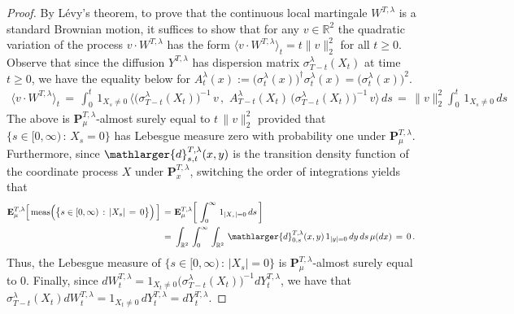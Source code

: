 \documentclass[10pt]{article}
\numberwithin{equation}{section}
\theoremstyle{definition}
\newcommand{\R}{{\mathbb R}}
\begin{document}
\begin{appendix}
\begin{proof}  By L\'evy's theorem,   to prove that the continuous local martingale $W^{T,\lambda}$ is a standard Brownian motion, it suffices to show that for any $v\in \R^2$  the quadratic variation of the process $v\cdot W^{T,\lambda}$ has the form    $\big\langle v\cdot W^{T,\lambda} \big\rangle_t=t\|v\|_2^2$ for all $t\geq 0$. 
Observe that since the diffusion $Y^{T,\lambda}$ has dispersion matrix $\sigma_{T-t}^{\lambda}(X_t) $ at time $t\geq 0$, we have the equality below for $A_{t}^{\lambda}(x):=\big(\sigma_{t}^{\lambda}(x)\big)^{\dagger}\sigma_{t}^{\lambda}(x)=\big(\sigma_{t}^{\lambda}(x)\big)^2$.
\begin{align*}
    \big\langle v\cdot W^{T,\lambda}\big\rangle_t\,=\,\int_0^t\, 1_{X_s\neq 0} \, \Big\langle \big(\sigma_{T-t}^{\lambda}(X_t)  \big)^{-1}\, v \,, \,\,A_{T-t}^{\lambda}(X_t)\, \big(\sigma_{T-t}^{\lambda}(X_t)  \big)^{-1}\, v  \Big\rangle    \, ds   \,=\,\|v\|_2^2\int_0^t \,1_{X_s\neq 0}   \, ds 
\end{align*}
The above is $\mathbf{P}^{T,\lambda}_{\mu}$-almost surely equal to $t\,\|v\|_2^2 $ provided that  $\{s\in [0,\infty)\, :\, X_s = 0   \}   $ has Lebesgue measure zero with probability one under $\mathbf{P}^{T,\lambda}_{\mu}$.  Furthermore, since $\mathlarger{d}^{T,\lambda}_{s,t}(x,y)$ is the transition density function of the coordinate process $X$ under $\mathbf{P}^{T,\lambda}_{x}$, switching the order of integrations yields that
\begin{align*}
    \mathbf{E}^{T,\lambda}_{\mu}\Big[\, \textup{meas}\Big(\big\{s\in [0,\infty)\, :\, | X_s| \,=\, 0   \big\}   \Big) \,  \Big]\,=\,&\,\mathbf{E}^{T,\lambda}_{\mu}\bigg[\, \int_0^{\infty}\, 1_{| X_s|  =  0  }\,ds     \, \bigg]
    \\ \,=\,&\,\int_{\R^2}\,\int_0^{\infty}\,\int_{\R^2}\,\mathlarger{d}^{T,\lambda}_{0,s}(x,y)\,1_{| y| = 0}\,dy\,ds\,\mu(dx)\,=\,0\,.
\end{align*}   
Thus, the Lebesgue measure of $\{s\in [0,\infty)\, :\, | X_s| = 0   \} $ is 
$\mathbf{P}^{T,\lambda}_{\mu}$-almost surely equal to $0$. Finally, since $dW^{T,\lambda }_t= 1_{X_t\neq 0} \big(\sigma_{T-t}^{\lambda}(X_t)\big)^{-1} dY_{t}^{T,\lambda}$, we have that $\sigma_{T-t}^{\lambda}(X_t)dW^{T,\lambda }_t=1_{X_t\neq 0}\, dY_{t}^{T,\lambda}=dY_{t}^{T,\lambda}$.
\end{proof}












\end{appendix}
\end{document}
